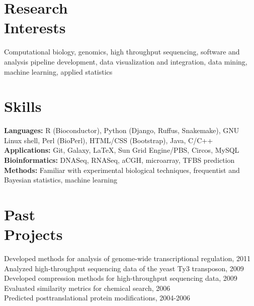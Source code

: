 \documentclass[margin,line]{res}
\begin{document}
\begin{resume}
\section{\sc Research\\Interests}
Computational biology, genomics, high throughput sequencing, software and analysis pipeline development, data visualization and integration, data mining, machine learning, applied statistics

\section{\sc Skills} 
\textbf{Languages:} R (Bioconductor), Python (Django, Ruffus, Snakemake), GNU Linux shell, Perl (BioPerl), HTML/CSS (Bootstrap), Java, C/C++\\
\textbf{Applications:} Git, Galaxy, \LaTeX, Sun Grid Engine/PBS, Circos, MySQL\\
\textbf{Bioinformatics:} DNASeq, RNASeq, aCGH, microarray, TFBS prediction\\
\textbf{Methods:} Familiar with experimental biological techniques, frequentist and Bayesian statistics, machine learning


\section{\sc Past\\Projects}
Developed methods for analysis of genome-wide transcriptional regulation, 2011 \\
Analyzed high-throughput sequencing data of the yeast Ty3 transposon, 2009\\
Developed compression methods for high-throughput sequencing data, 2009 \\
Evaluated similarity metrics for chemical search, 2006\\
Predicted posttranslational protein modifications, 2004-2006


\end{resume}
\end{document}
